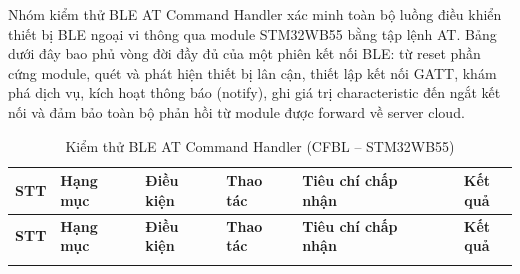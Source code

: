         Nhóm kiểm thử BLE AT Command Handler xác minh toàn bộ luồng điều khiển thiết bị BLE ngoại vi thông qua module STM32WB55 bằng tập lệnh AT. Bảng dưới đây bao phủ vòng đời đầy đủ của một phiên kết nối BLE: từ reset phần cứng module, quét và phát hiện thiết bị lân cận, thiết lập kết nối GATT, khám phá dịch vụ, kích hoạt thông báo (notify), ghi giá trị characteristic đến ngắt kết nối và đảm bảo toàn bộ phản hồi từ module được forward về server cloud.

        \begin{longtable}{|c|p{2cm}|p{2.5cm}|p{3.5cm}|p{4cm}|c|}
            \caption{Kiểm thử BLE AT Command Handler (CFBL -- STM32WB55)}
            \label{tab:test_ble_at_handler} \\
            \hline
            \textbf{STT} & \textbf{Hạng mục} & \textbf{Điều kiện} & \textbf{Thao tác} & \textbf{Tiêu chí chấp nhận} & \textbf{Kết quả} \\ \hline
            \endfirsthead
            \hline
            \textbf{STT} & \textbf{Hạng mục} & \textbf{Điều kiện} & \textbf{Thao tác} & \textbf{Tiêu chí chấp nhận} & \textbf{Kết quả} \\ \hline
            \endhead
            \hline
            \endfoot
            \endlastfoot


\end{longtable}
